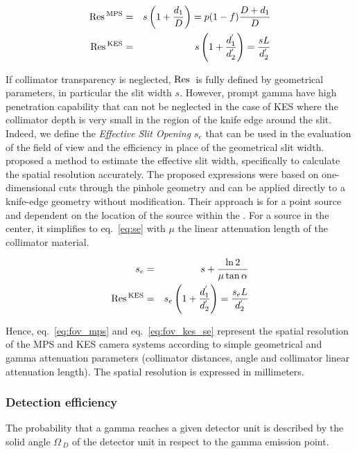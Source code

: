 \documentclass[a4paper,english,12pt]{article}
\begin{document}
\begin{eqnarray}
  \label{eq:fov_mps}
  \textrm{Res}\,_{}^{\textrm{MPS}} & = & s\left(1+ \frac{d_1}{D}\right) = p(1-f) \frac{D+d_1}{D} \\
  \label{eq:fov_kes}
   \textrm{Res}\,_{}^{\textrm{KES}} & = & s\left(1+ \frac{d_1^{'}}{d_2^{'}}\right) = \frac{sL}{d_2^{'}}
\end{eqnarray}

If collimator transparency is neglected, $\textrm{Res}\,_{}$ is fully defined by geometrical parameters, in particular the slit width $s$. However, prompt gamma have high penetration capability that can not be neglected in the case of KES where the collimator depth is very small in the region of the knife edge around the slit. Indeed, we define the \textit{Effective Slit Opening} $s_e$ that can be used in the evaluation of the field of view and the efficiency in place of the geometrical slit width. \cite{Metzler2005}
proposed a method to estimate the effective slit width, specifically to calculate
the spatial resolution accurately. The proposed expressions were based on
one-dimensional cuts through the pinhole geometry and can be applied directly to
a knife-edge geometry without modification. Their approach is for a point source
and dependent on the location of the source within the \FOV. For a source in the
center, it simplifies to eq.~\ref{eq:se} with $\mu$ the linear attenuation
length of the collimator material.

\begin{eqnarray}
  s_e & = & s + \frac{\ln2}{\mu\tan\alpha}   \label{eq:se} \\
   \textrm{Res}\,_{}^{\textrm{KES}} & = & s_e\left(1+ \frac{d_1^{'}}{d_2^{'}}\right) = \frac{s_eL}{d_2^{'}}          
  \label{eq:fov_kes_se}
\end{eqnarray}

Hence, eq.~\ref{eq:fov_mps} and eq.~\ref{eq:fov_kes_se} represent the spatial resolution of the MPS and KES camera systems according to simple geometrical and gamma attenuation parameters (collimator distances, angle and collimator linear attenuation length). The spatial resolution is expressed in millimeters. 

\subsubsection{Detection efficiency}

The probability that a gamma reaches a given detector unit is described by the solid angle $\Omega\,_D$ of the detector unit in respect to the gamma emission point. 
\end{document}
